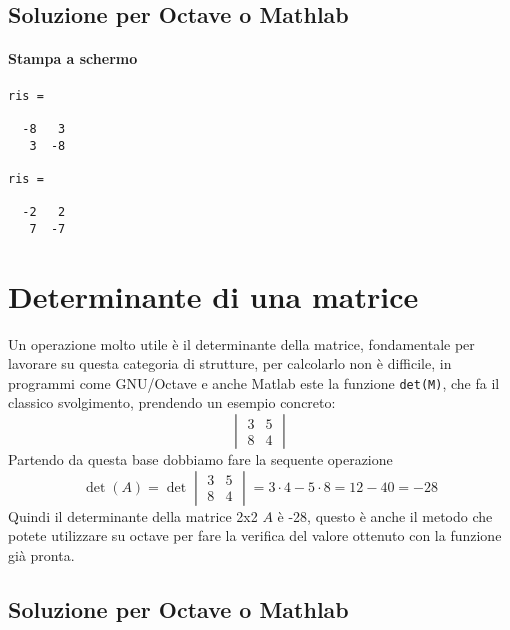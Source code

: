 \subsection{Soluzione per Octave o Mathlab}
\label{sec:solmatoctes1}

\paragraph{Stampa a schermo}
\begin{verbatim}
ris =

  -8   3
   3  -8

ris =

  -2   2
   7  -7
\end{verbatim}


\section{Determinante di una matrice}
\label{sec:mtxdet}
Un operazione molto utile è il determinante della matrice, fondamentale per
lavorare su questa categoria di strutture, per calcolarlo non è difficile, in
programmi come GNU/Octave e anche Matlab este la funzione \lstinline|det(M)|,
che fa il classico svolgimento, prendendo un esempio concreto:
\begin{equation}
  \label{eq:es2}
  \begin{vmatrix}
    3 & 5\\
    8 & 4
  \end{vmatrix}
\end{equation}
Partendo da questa base dobbiamo fare la sequente operazione
\begin{equation}
  \label{eq:es2_sv}
  \det(A) =\det \begin{vmatrix}
    3 & 5\\
    8 & 4
  \end{vmatrix}= 3\cdot 4 -5\cdot 8 = 12 - 40 = -28
\end{equation}
Quindi il determinante della matrice 2x2 $A$ è -28, questo è anche il metodo che
potete utilizzare su octave per fare la verifica del valore ottenuto con la
funzione già pronta.
\subsection{Soluzione per Octave o Mathlab}
\label{sec:solmatoctes2}


